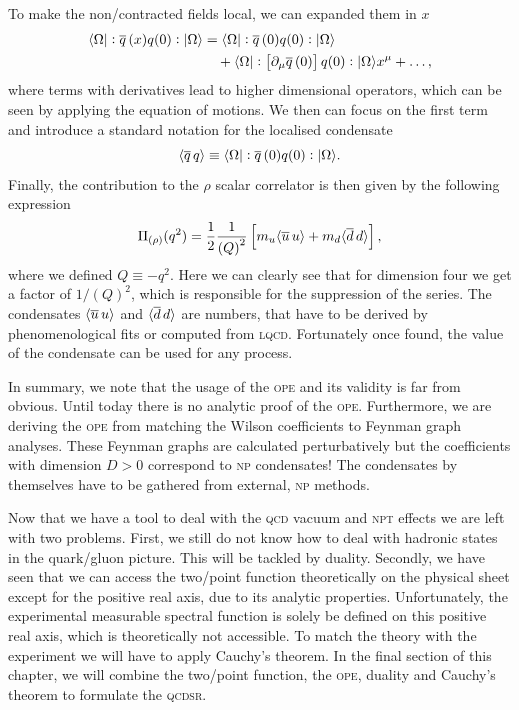 \documentclass[../../index.tex]{subfiles}
\begin{document}
To make the non\-/contracted fields local, we can expanded them in \(x\)
\begin{equation}
  \begin{split}
    \langle \Omega \vert: \overline{q}\,(x) q(0):\vert \Omega \rangle &= \langle\Omega\vert: \overline{q}\,(0) q(0): \vert\Omega\rangle\\
    &\quad+ \langle\Omega\vert:\left[ \partial_\mu \overline{q}\,(0) \right]
    q(0):\vert\Omega\rangle x^\mu + \dots,
  \end{split}
\end{equation}
where terms with derivatives lead to higher dimensional operators, which can be
seen by applying the equation of motions. We then can focus on the first term
and introduce a standard notation for the localised condensate
\begin{equation}
  \langle \overline{q}\,q \rangle \equiv \langle\Omega\vert: \overline{q}\,(0) q(0):\vert\Omega\rangle.
\end{equation}
Finally, the contribution to the \(\rho\) scalar correlator is then given by the
following expression
\begin{equation}
  \Pi_{(\rho)}(q^2) = \frac{1}{2} \frac{1}{\left(Q\right)^2}
  \left[ m_u\langle \overline{u}\, u \rangle + m_d \langle \overline{d}\, d \rangle\right],
\end{equation}
where we defined \(Q \equiv -q^2\). Here we can clearly see that for dimension
four we get a factor of \(1/(Q)^2\), which is responsible for the suppression of
the series. The condensates \(\langle\overline{u}\,u\rangle\) and
\(\langle\overline{d}\,d\rangle\) are numbers, that have to be derived by
phenomenological fits or computed from \textsc{lqcd}. Fortunately once found,
the value of the condensate can be used for any process.

In summary, we note that the usage of the \textsc{ope} and its validity is far
from obvious. Until today there is no analytic proof of the \textsc{ope}.
Furthermore, we are deriving the \textsc{ope} from matching the Wilson
coefficients to Feynman graph analyses. These Feynman graphs are calculated
perturbatively but the coefficients with dimension \(D>0\) correspond to
\textsc{np} condensates! The condensates by themselves have to be gathered from
external, \textsc{np} methods.

Now that we have a tool to deal with the \textsc{qcd} vacuum and \textsc{npt}
effects we are left with two problems. First, we still do not know how to deal
with hadronic states in the quark\-/gluon picture. This will be tackled by
duality. Secondly, we have seen that we can access the two\-/point function
theoretically on the physical sheet except for the positive real axis, due to
its analytic properties. Unfortunately, the experimental measurable spectral
function is solely be defined on this positive real axis, which is theoretically
not accessible. To match the theory with the experiment we will have to apply
Cauchy's theorem. In the final section of this chapter, we will combine the
two\-/point function, the \textsc{ope}, duality and Cauchy's theorem to
formulate the \textsc{qcdsr}.
\end{document}
